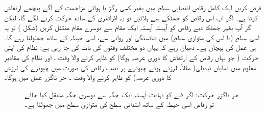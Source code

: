 

 
فرض کریں ایک کامل   رقاص   انتصابی سطح  میں بغیر کسی رگڑ یا ہوائی مزاحمت کے آگے پیچھے ارتعاش کرتا ہے۔ اگر آپ اس   رقاص   کو  جھٹکے سے ہلائیں تو یہ افراتفری کے ساتھ  حرکت کرنے لگے گا،  لیکن اگر آپ بغیر جھٹکا دیے    رقاص   کو آہستہ آہستہ ایک مقام سے دوسرے  مقام منتقل کریں (شکل )    تو   یہ    اسی سطح  (یا اس کی  متوازی سطح)  میں شائستگی اور روانی سے،  اسی حیطہ کے ساتھ جھلولتا رہے گا۔  ہی  عمل کی پہچان ہے۔ دھیان رہے کہ یہاں دو مختلف   وقتوں کی بات کی جا رہی ہے:  نظام کی اپنی  حرکت (  جو یہاں   رقاص   کے  ارتعاش کا دوری عرصہ ہوگا)   کو ظاہر کرنے والا  وقت ،  اور نظام  کی مقادیر معلوم میں  نمایاں تبدیلی( مثلاً،  لرزتے ہوئے چبوترے  پر نصب   رقاص   کی صورت میں چبوترے کی لرزش کا دوری عرصہ)  کو ظاہر کرنے والا   وقت ۔ حر ناگزر عمل میں  ہوگا۔

\begin{figure}
\centering
{}
\caption{حر ناگزر حرکت: اگر ڈبے کو نہایت آہستہ ایک جگہ سے دوسری جگہ منتقل کیا جائے تو   رقاص   اسی حیطہ کے ساتھ ابتدائی سطح کی متوازی سطح میں جھولتا ہے۔}
\label{شکل_حرارت_نا_گزر_آہستہ_منتقلی}
\end{figure}



